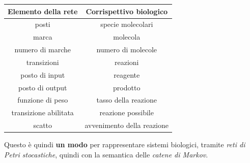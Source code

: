 \documentclass[a4paper,12pt, oneside]{book}
\begin{document}
\begin{table}[H]
  \centering
  \begin{tabular}{c|c}
    \textbf{Elemento della rete} & \textbf{Corrispettivo biologico}\\
    \hline
    \hline
    posti & specie molecolari\\
    \hline
    marca & molecola\\
    \hline
    numero di marche & numero di molecole\\
    \hline
    transizioni & reazioni\\
    \hline
    posto di input & reagente\\
    \hline
    posto di output & prodotto\\
    \hline
    funzione di peso & tasso della reazione\\
    \hline
    transizione abilitata & reazione possibile\\
    \hline
    scatto & avvenimento della reazione
  \end{tabular}
\end{table}
Questo è quindi \textbf{un modo} per rappresentare sistemi biologici, tramite
\textit{reti di Petri stocastiche}, quindi con la semantica delle \textit{catene
  di Markov}.
\end{document}
